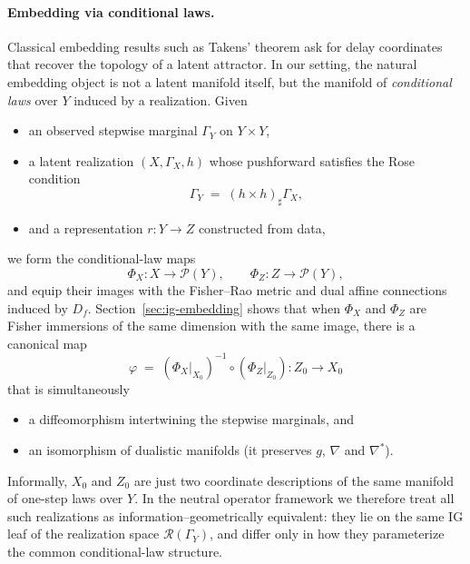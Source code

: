 \documentclass[11pt]{article}
\newcommand{\1}{\mathbf{1}}
\begin{document}
\paragraph{Embedding via conditional laws.}
Classical embedding results such as Takens' theorem ask for delay coordinates that recover the topology of a latent attractor.  In our setting, the natural embedding object is not a latent manifold itself, but the manifold of \emph{conditional laws} over $Y$ induced by a realization.  Given
\begin{itemize}[leftmargin=1.5em]
  \item an observed stepwise marginal $\Gamma_Y$ on $Y\times Y$,
  \item a latent realization $(X,\Gamma_X,h)$ whose pushforward satisfies the Rose condition
  \[
    \Gamma_Y \;=\; (h\times h)_{\sharp}\Gamma_X,
  \]
  \item and a representation $r:Y\to Z$ constructed from data,
\end{itemize}
we form the conditional-law maps
\[
  \Phi_X:X\to\mathcal{P}(Y),
  \qquad
  \Phi_Z:Z\to\mathcal{P}(Y),
\]
and equip their images with the Fisher--Rao metric and dual affine connections induced by $D_f$.  Section~\ref{sec:ig-embedding} shows that when $\Phi_X$ and $\Phi_Z$ are Fisher immersions of the same dimension with the same image, there is a canonical map
\[
  \varphi \;=\; (\Phi_X|_{X_0})^{-1}\circ(\Phi_Z|_{Z_0}) : Z_0\to X_0
\]
that is simultaneously
\begin{itemize}[leftmargin=1.5em]
  \item a diffeomorphism intertwining the stepwise marginals, and
  \item an isomorphism of dualistic manifolds (it preserves $g$, $\nabla$ and $\nabla^\ast$).
\end{itemize}
Informally, $X_0$ and $Z_0$ are just two coordinate descriptions of the same manifold of one-step laws over $Y$.  In the neutral operator framework we therefore treat all such realizations as information--geometrically equivalent: they lie on the same IG leaf of the realization space $\mathcal{R}(\Gamma_Y)$, and differ only in how they parameterize the common conditional-law structure.
\end{document}
